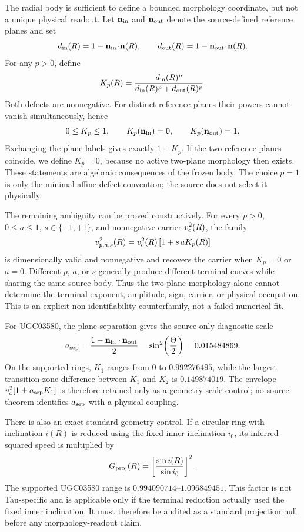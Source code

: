 \documentclass[11pt]{article}
\begin{document}
The radial body is sufficient to define a bounded morphology coordinate, but
not a unique physical readout.  Let \(\mathbf n_{\rm in}\) and
\(\mathbf n_{\rm out}\) denote the source-defined reference planes and set
\[
d_{\rm in}(R)=1-\mathbf n_{\rm in}\!\cdot\!\mathbf n(R),
\qquad
d_{\rm out}(R)=1-\mathbf n_{\rm out}\!\cdot\!\mathbf n(R).
\]
For any \(p>0\), define
\[
K_p(R)=
\frac{d_{\rm in}(R)^p}
     {d_{\rm in}(R)^p+d_{\rm out}(R)^p}.
\]
Both defects are nonnegative.  For distinct reference planes their powers
cannot vanish simultaneously, hence
\[
0\leq K_p\leq1,\qquad
K_p(\mathbf n_{\rm in})=0,\qquad
K_p(\mathbf n_{\rm out})=1.
\]
Exchanging the plane labels gives exactly \(1-K_p\).  If the two reference
planes coincide, we define \(K_p=0\), because no active two-plane morphology
then exists.  These statements are algebraic consequences of the frozen body.
The choice \(p=1\) is only the minimal affine-defect convention; the source
does not select it physically.

The remaining ambiguity can be proved constructively.  For every
\(p>0\), \(0\leq a\leq1\), \(s\in\{-1,+1\}\), and nonnegative carrier
\(v_{\rm c}^2(R)\), the family
\[
v_{p,a,s}^2(R)=v_{\rm c}^2(R)\,[1+s\,aK_p(R)]
\]
is dimensionally valid and nonnegative and recovers the carrier when
\(K_p=0\) or \(a=0\).  Different \(p\), \(a\), or \(s\) generally produce
different terminal curves while sharing the same source body.  Thus the
two-plane morphology alone cannot determine the terminal exponent, amplitude,
sign, carrier, or physical occupation.  This is an explicit non-identifiability
counterfamily, not a failed numerical fit.

For UGC03580, the plane separation gives the source-only diagnostic scale
\[
a_{\rm sep}=\frac{1-\mathbf n_{\rm in}\cdot\mathbf n_{\rm out}}{2}
=\sin^2\!\left(\frac{\Theta}{2}\right)
=0.015484869.
\]
On the supported rings, \(K_1\) ranges from \(0\) to \(0.992276495\), while
the largest transition-zone difference between \(K_1\) and \(K_2\) is
\(0.149874019\).  The envelope
\(v_{\rm c}^2[1\pm a_{\rm sep}K_1]\) is therefore retained only as a
geometry-scale control; no source theorem identifies \(a_{\rm sep}\) with a
physical coupling.

There is also an exact standard-geometry control.  If a circular ring with
inclination \(i(R)\) is reduced using the fixed inner inclination \(i_0\), its
inferred squared speed is multiplied by
\[
G_{\rm proj}(R)=\left[\frac{\sin i(R)}{\sin i_0}\right]^2.
\]
The supported UGC03580 range is \(0.994090714\)--\(1.096849451\).  This factor
is not Tau-specific and is applicable only if the terminal reduction actually
used the fixed inner inclination.  It must therefore be audited as a standard
projection null before any morphology-readout claim.
\end{document}
